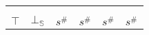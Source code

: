 \documentclass{beamer}
\begin{document}
\begin{frame}
\begin{table}
\begin{tabular}{|l|l|ll|ll|ll|l|}
                                        &                         & \multicolumn{2}{l|}{}                        & \multicolumn{2}{l|}{}                        & \multicolumn{2}{l|}{}                        &                         \\
                                        &                         & \multicolumn{2}{l|}{}                        & \multicolumn{2}{l|}{}                        & \multicolumn{2}{l|}{}                        &                         \\ \hline
        $\top$                          & $\bot_\mathbb{S}$                  & \multicolumn{2}{l|}{$s^\#$}                  & \multicolumn{2}{l|}{$s^\#$}                  & \multicolumn{2}{l|}{$s^\#$}                  & $s^\#$                  \\ \hline
        \end{tabular}
        \end{table}
    \end{frame}
    
    
    
\end{document}
